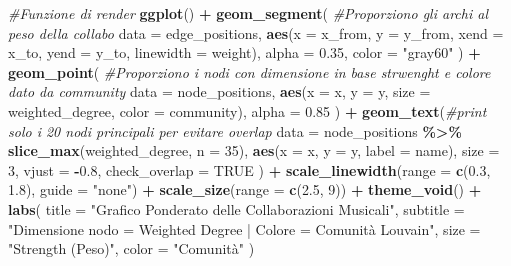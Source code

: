 \documentclass[
]{article}
\newenvironment{Shaded}{\begin{snugshade}}{\end{snugshade}}
\newcommand{\AttributeTok}[1]{\textcolor[rgb]{0.13,0.29,0.53}{#1}}
\newcommand{\CommentTok}[1]{\textcolor[rgb]{0.56,0.35,0.01}{\textit{#1}}}
\newcommand{\ConstantTok}[1]{\textcolor[rgb]{0.56,0.35,0.01}{#1}}
\newcommand{\DecValTok}[1]{\textcolor[rgb]{0.00,0.00,0.81}{#1}}
\newcommand{\FloatTok}[1]{\textcolor[rgb]{0.00,0.00,0.81}{#1}}
\newcommand{\FunctionTok}[1]{\textcolor[rgb]{0.13,0.29,0.53}{\textbf{#1}}}
\newcommand{\NormalTok}[1]{#1}
\newcommand{\SpecialCharTok}[1]{\textcolor[rgb]{0.81,0.36,0.00}{\textbf{#1}}}
\newcommand{\StringTok}[1]{\textcolor[rgb]{0.31,0.60,0.02}{#1}}
\newcounter{none} %
\begin{document}
\begin{Shaded}
\begin{Highlighting}[]
\CommentTok{\#Funzione di render}
\FunctionTok{ggplot}\NormalTok{() }\SpecialCharTok{+}
  \FunctionTok{geom\_segment}\NormalTok{( }\CommentTok{\#Proporziono gli archi al peso della collabo}
    \AttributeTok{data =}\NormalTok{ edge\_positions,}
    \FunctionTok{aes}\NormalTok{(}\AttributeTok{x =}\NormalTok{ x\_from, }\AttributeTok{y =}\NormalTok{ y\_from, }\AttributeTok{xend =}\NormalTok{ x\_to, }\AttributeTok{yend =}\NormalTok{ y\_to, }\AttributeTok{linewidth =}\NormalTok{ weight),}
    \AttributeTok{alpha =} \FloatTok{0.35}\NormalTok{,}
    \AttributeTok{color =} \StringTok{"gray60"}
\NormalTok{  ) }\SpecialCharTok{+}
  \FunctionTok{geom\_point}\NormalTok{( }\CommentTok{\#Proporziono i nodi con dimensione in base strwenght e colore dato da community}
    \AttributeTok{data =}\NormalTok{ node\_positions,}
    \FunctionTok{aes}\NormalTok{(}\AttributeTok{x =}\NormalTok{ x, }\AttributeTok{y =}\NormalTok{ y, }\AttributeTok{size =}\NormalTok{ weighted\_degree, }\AttributeTok{color =}\NormalTok{ community),}
    \AttributeTok{alpha =} \FloatTok{0.85}
\NormalTok{  ) }\SpecialCharTok{+}
  \FunctionTok{geom\_text}\NormalTok{(}\CommentTok{\#print solo i 20 nodi principali per evitare overlap}
    \AttributeTok{data =}\NormalTok{ node\_positions }\SpecialCharTok{\%\textgreater{}\%} \FunctionTok{slice\_max}\NormalTok{(weighted\_degree, }\AttributeTok{n =} \DecValTok{35}\NormalTok{),}
    \FunctionTok{aes}\NormalTok{(}\AttributeTok{x =}\NormalTok{ x, }\AttributeTok{y =}\NormalTok{ y, }\AttributeTok{label =}\NormalTok{ name),}
    \AttributeTok{size =} \DecValTok{3}\NormalTok{,}
    \AttributeTok{vjust =} \SpecialCharTok{{-}}\FloatTok{0.8}\NormalTok{,}
    \AttributeTok{check\_overlap =} \ConstantTok{TRUE}
\NormalTok{  ) }\SpecialCharTok{+}
  \FunctionTok{scale\_linewidth}\NormalTok{(}\AttributeTok{range =} \FunctionTok{c}\NormalTok{(}\FloatTok{0.3}\NormalTok{, }\FloatTok{1.8}\NormalTok{), }\AttributeTok{guide =} \StringTok{"none"}\NormalTok{) }\SpecialCharTok{+}
  \FunctionTok{scale\_size}\NormalTok{(}\AttributeTok{range =} \FunctionTok{c}\NormalTok{(}\FloatTok{2.5}\NormalTok{, }\DecValTok{9}\NormalTok{)) }\SpecialCharTok{+}
  \FunctionTok{theme\_void}\NormalTok{() }\SpecialCharTok{+}
  \FunctionTok{labs}\NormalTok{(}
    \AttributeTok{title    =} \StringTok{"Grafico Ponderato delle Collaborazioni Musicali"}\NormalTok{,}
    \AttributeTok{subtitle =} \StringTok{"Dimensione nodo = Weighted Degree | Colore = Comunità Louvain"}\NormalTok{,}
    \AttributeTok{size     =} \StringTok{"Strength (Peso)"}\NormalTok{,}
    \AttributeTok{color    =} \StringTok{"Comunità"}
\NormalTok{  )}
\end{Highlighting}
\end{Shaded}
\end{document}
